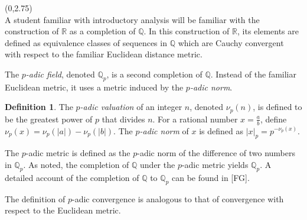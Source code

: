 \documentclass[a0]{a0poster}
\theoremstyle{definition}
\newtheorem{example}{Example}
\newtheorem{definition}{Definition}
\def\LHead#1{\noindent{\bf \LARGE\color{DarkBlue} #1}\smallskip}
\newcommand{\Q}{\mathbb{Q}}
\newcommand{\fcite}[1]{[#1]}
\begin{document}
\begin{textblock}{7}(0,2.75)
  \LHead{Introduction}\\
\indent A student familiar with introductory analysis will be familiar with the construction of $\mathbb{R}$ as a completion of $\mathbb{Q}$. In this construction of $\mathbb{R}$, its elements are defined as equivalence classes of sequences in $\mathbb{Q}$ which are Cauchy convergent with respect to the familiar Euclidean distance metric.  

The \textit{$p$-adic field}, denoted $\mathbb{Q}_p$, is a second completion of $\mathbb{Q}$. Instead of the familiar Euclidean metric, it uses a metric induced by the {\it $p$-adic norm}.

\begin{definition} The {\it $p$-adic valuation} of an integer $n$, denoted $\nu_p(n)$, is defined to be the greatest power of $p$ that divides $n$. For a rational number $x=\frac{a}{b}$, define $\nu_p(x)=\nu_p(|a|)-\nu_p(|b|)$. The {\it $p$-adic norm} of $x$ is defined as $|x|_p=p^{-\nu_p(x)}$.
\end{definition}

  

The $p$-adic metric is defined as the $p$-adic norm of the difference of two numbers in $\mathbb{Q}_p$. As noted, the completion of $\mathbb{Q}$ under the $p$-adic metric yields $\Q_p$. A detailed account of the completion of $\Q$ to $\Q_p$ can be found in \fcite{FG}.


The definition of $p$-adic convergence is analogous to that of convergence with respect to the Euclidean metric.


\end{textblock}
\end{document}
